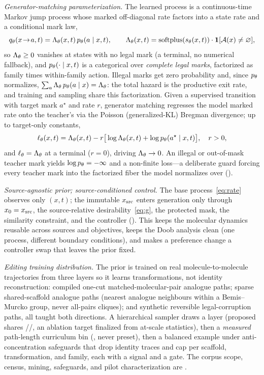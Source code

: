 \emph{Generator-matching parameterization.} The learned process is a continuous-time Markov jump process
whose marked off-diagonal rate factors into a state rate and a conditional mark law,
\begin{equation}
q_\theta(x\!\to\!a,t)=\Lambda_\theta(x,t)\,p_\theta(a\mid x,t),\qquad
\Lambda_\theta(x,t)=\mathrm{softplus}(s_\theta(x,t))\cdot\mathbf{1}[\mathcal{A}(x)\neq\varnothing],
\label{eq:rate}
\end{equation}
so $\Lambda_\theta\ge0$ vanishes at states with no legal mark (a terminal, no numerical fallback), and
$p_\theta(\cdot\mid x,t)$ is a categorical over \emph{complete legal marks}, factorized as family times
within-family action. Illegal marks get zero probability and, since $p_\theta$ normalizes,
$\sum_a\Lambda_\theta\,p_\theta(a\mid x)=\Lambda_\theta$: the total hazard is the productive exit rate, and training and
sampling share this factorization. Given a supervised transition with target mark $a^\star$ and rate $r$,
generator matching regresses the model marked rate onto the teacher's via the Poisson (generalized-KL)
Bregman divergence; up to target-only constants,
\begin{equation}
\ell_\theta(x,t)=\Lambda_\theta(x,t)-r\big[\log\Lambda_\theta(x,t)+\log p_\theta(a^\star\mid x,t)\big],\quad r>0,
\label{eq:bregman}
\end{equation}
and $\ell_\theta=\Lambda_\theta$ at a terminal ($r{=}0$), driving $\Lambda_\theta\to0$. An illegal or out-of-mask teacher
mark yields $\log p_\theta=-\infty$ and a non-finite loss---a deliberate guard forcing every teacher mark
into the factorized fiber the model normalizes over ().

\emph{Source-agnostic prior; source-conditioned control.} The base process~\eqref{eq:rate} observes only
$(x,t)$; the immutable $x_{\mathrm{src}}$ enters generation only through $x_0=x_{\mathrm{src}}$, the source-relative
desirability~\eqref{eq:g}, the protected mask, the similarity constraint, and the controller
(). This keeps the molecular dynamics reusable across sources and objectives, keeps
the Doob analysis clean (one process, different boundary conditions), and makes a preference change a
controller swap that leaves the prior fixed.

\emph{Editing training distribution.} The prior is trained on real molecule-to-molecule trajectories from
three layers so it learns transformations, not identity reconstruction: compiled one-cut
matched-molecular-pair analogue paths; sparse shared-scaffold analogue paths (nearest analogue neighbours
within a Bemis--Murcko group, never all-pairs cliques); and synthetic reversible legal-corruption paths,
all taught both directions. A hierarchical sampler draws a layer (proposed shares
//, an
ablation target finalized from at-scale statistics), then a \emph{measured} path-length curriculum bin
(, never preset), then a balanced example under anti-concentration
safeguards that drop identity traces and cap per scaffold, transformation, and family, each with a signal
and a gate. The corpus scope, census, mining, safeguards, and pilot characterization are .
